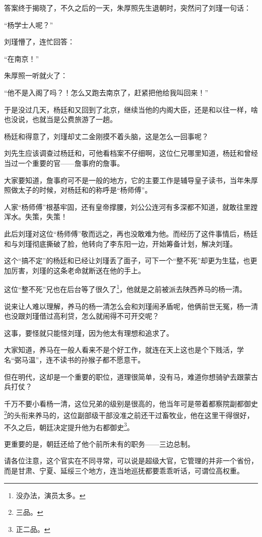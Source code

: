 \begin{multicols}{\theparacolNo}
		答案终于揭晓了，不久之后的一天，朱厚照先生退朝时，突然问了刘瑾一句话：

		“杨学士人呢？”

		刘瑾懵了，连忙回答：

		“在南京！”

		朱厚照一听就火了：

		“他不是入阁了吗？！怎么又跑去南京了，赶紧把他给我叫回来！”

		于是没过几天，杨廷和又回到了北京，继续当他的内阁大臣，还是和以往一样，啥也没说，也就当是公费旅游了一趟。

		杨廷和得意了，刘瑾却丈二金刚摸不着头脑，这是怎么一回事呢？

		刘先生应该调查过杨廷和，可他看档案不仔细啊，这位仁兄哪里知道，杨廷和曾经当过一个重要的官——詹事府的詹事。

		大家要知道，詹事府可不是一般的地方，它的主要工作是辅导皇子读书，当年朱厚照做太子的时候，对杨廷和的称呼是“杨师傅”。

		人家“杨师傅”根基牢固，还有皇帝撑腰，刘公公连河有多深都不知道，就敢往里蹚浑水。失策，失策！

		此后刘瑾对这位“杨师傅”敬而远之，再也没敢难为他。而经历了这件事情后，杨廷和与刘瑾彻底撕破了脸，他转向了李东阳一边，开始筹备计划，解决刘瑾。

		这个“搞不定”的杨廷和已经让刘瑾丢了面子，可下一个“整不死”却更为生猛，也更加厉害，刘瑾的这条老命就断送在他的手上。

		这位“整不死”兄也在后台等了很久了\footnote{没办法，演员太多。}，他就是之前被派去陕西养马的杨一清。

		说来让人难以理解，养马的杨一清怎么会和刘瑾闹矛盾呢，他俩前世无冤，杨一清也没跟刘瑾借过高利贷，怎么就闹得不可开交呢？

		这事，要怪就只能怪刘瑾，因为他太有理想和追求了。

		大家知道，养马在一般人看来不是个好工作，就连在天上这也是个下贱活，学名“弼马温”，连不读书的孙猴子都不愿意干。

		但在明代，这却是一个重要的职位，道理很简单，没有马，难道你想骑驴去跟蒙古兵打仗？

		千万不要小看杨一清，这位兄弟的级别是很高的，他当年可是带着都察院副都御史\footnote{三品。}的头衔来养马的，这位副部级干部没准之前还干过畜牧业，他在这里干得很好，不久之后，朝廷决定提升他为右都御史\footnote{正二品。}。

		更重要的是，朝廷还给了他个前所未有的职务——三边总制。

		请各位注意，这个官实在不同寻常，可以说是超级大官，它管理的并非一个省份，而是甘肃、宁夏、延绥三个地方，连当地巡抚都要乖乖听话，可谓位高权重。


\end{multicols}
